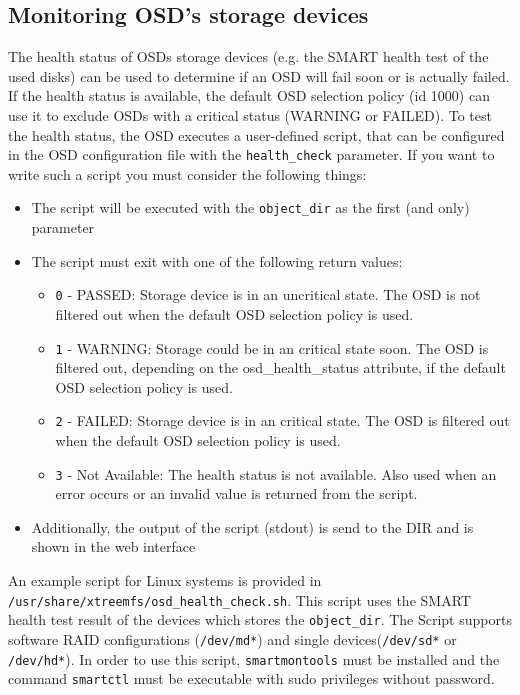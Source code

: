 \documentclass[a4paper,10pt]{book}
\begin{document}
\subsection{Monitoring OSD's storage devices}
\label{sec:osd-health-script}
The health status of OSDs storage devices (e.g. the SMART health test of the
used disks) can be used to determine if an OSD will fail soon or is actually
failed. If the health status is available, the default OSD selection policy
(id 1000) can use it to exclude OSDs with a critical status (WARNING or
FAILED). To test the health status, the OSD executes a user-defined script, that
can be configured in the OSD configuration file with the \texttt{health\_check}
parameter. If you want to write such a script you must consider the following
things:

\begin{itemize}
\item The script will be executed with the \texttt{object\_dir} as the first
(and only) parameter 
\item The script must exit with one of the following return values:
\begin{itemize}
\item \texttt{0} - PASSED: Storage device is in an uncritical state. The OSD
is not filtered out when the default OSD selection policy is used.
\item \texttt{1} - WARNING: Storage could be in an critical state soon. The OSD
is filtered out, depending on the osd\_health\_status attribute, if the
default OSD selection policy is used.
\item \texttt{2} - FAILED: Storage device is in an critical state. The OSD is
filtered out when the default OSD selection policy is used.
\item \texttt{3} - Not Available: The health status is not available. Also used
when an error occurs or an invalid value is returned from the script.
\end{itemize}
\item Additionally, the output of the script (stdout) is send to the DIR and is
shown in the web interface
\end{itemize}
An example script for Linux systems is provided in
\texttt{/usr/share/xtreemfs/osd\_health\_check.sh}. This script uses the SMART
health test result of the devices which stores the \texttt{object\_dir}. The
Script supports software RAID configurations (\texttt{/dev/md*}) and single
devices(\texttt{/dev/sd*} or \texttt{/dev/hd*}). In order to use this script,
\texttt{smartmontools} must be installed and the command \texttt{smartctl} must
be executable with sudo privileges without password.
\end{document}
